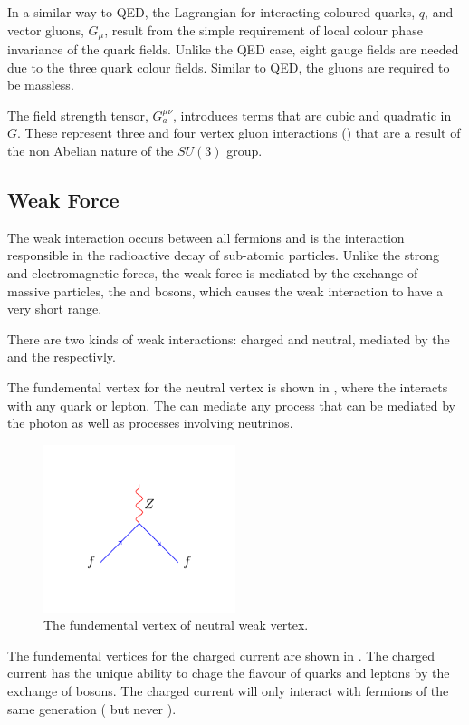 In a similar way to QED, the Lagrangian for interacting coloured quarks, $q$, and
vector gluons, $G_{\mu}$, result from the simple requirement of local colour
phase invariance of the quark fields. Unlike the QED case, eight gauge fields
are needed due to the three quark colour fields.  Similar to QED, the gluons are
required to  be massless.

The field strength tensor, $G^{\mu\nu}_{a}$, introduces terms that are cubic and
quadratic in $G$. These represent three and four vertex gluon interactions
() that are a result of the non Abelian nature of the $SU(3)$ group.
 
\subsection{Weak Force}
The weak interaction occurs between all fermions and is the interaction
responsible in the radioactive decay of sub-atomic particles.  Unlike the strong
and electromagnetic forces, the weak force is mediated by the exchange of
massive particles, the \PWpm and \PZ bosons, which causes the weak interaction
to have a very short range.

There are two kinds of weak interactions: charged and neutral, mediated by the
\PW and the \PZ respectivly.

The fundemental vertex for the neutral vertex is shown in
, where the \PZ interacts with any quark or lepton.
The \PZ can mediate any process that can be mediated by the photon as well as
processes involving neutrinos.
\begin{figure}[htbp]
  \centering
  \includegraphics[width=0.5\textwidth]{weak_neut_process}
  \caption{The fundemental vertex of neutral weak vertex.}
  \label{fig:neutral}
\end{figure}

The fundemental vertices for the charged current are shown in
. The charged current has the unique ability to chage the
flavour of quarks and leptons by the exchange of \PW bosons. The charged current
will only interact with fermions of the same generation
(\HepProcess{\Pelectron\to\Pnue} but never
\HepProcess{\Pelectron\to\Pnum}).

